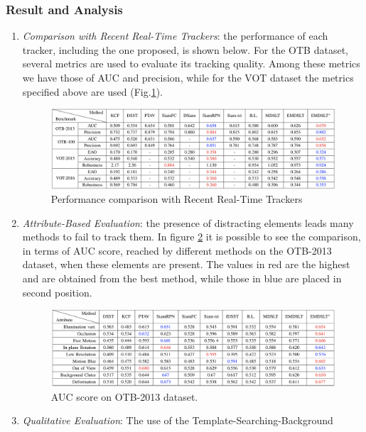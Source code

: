 \subsubsection{Result and Analysis}
\begin{enumerate}
    \item \emph{Comparison with Recent Real-Time Trackers}: the performance of each tracker, including the one proposed, is shown below. For the OTB dataset, several metrics are used to evaluate its tracking quality. Among these metrics we have those of AUC and precision, while for the VOT dataset the metrics specified above are used (Fig.\ref{fig:PerfComp}).
    \begin{figure}[h!]
        \centering
        \includegraphics[width = \linewidth]{images/paper8/metrics.png}
        \centering
        \caption{Performance comparison with Recent Real-Time Trackers}
        \label{fig:PerfComp}
    \end{figure}
    \item \emph{Attribute-Based Evaluation}: the presence of distracting elements leads 
    many methods to fail to track them. In figure \ref{fig:AUCScore} it is possible to see the 
    comparison, in terms of AUC score, reached by different methods on 
    the OTB-2013 dataset, when these elements are present. The values 
    in red are the highest and are obtained from the best method, while 
    those in blue are placed in second position.
    \begin{figure}[h!]
        \centering
        \includegraphics[width = \linewidth]{images/paper8/AUC.png}
        \centering
        \caption{AUC score on OTB-2013 dataset.}
        \label{fig:AUCScore}
    \end{figure}
    \item \emph{Qualitative Evaluation}: The use of the Template-Searching-Background 

\end{enumerate}
